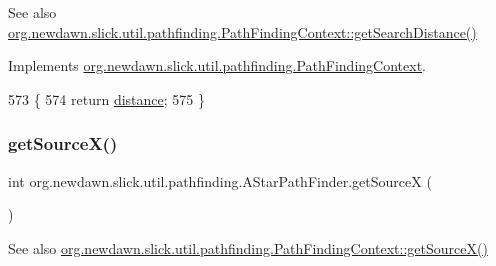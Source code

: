\begin{DoxySeeAlso}{See also}
\mbox{\hyperlink{interfaceorg_1_1newdawn_1_1slick_1_1util_1_1pathfinding_1_1_path_finding_context_af6c873041cbca8ad6edfd63c6e10d243}{org.\+newdawn.\+slick.\+util.\+pathfinding.\+Path\+Finding\+Context\+::get\+Search\+Distance()}} 
\end{DoxySeeAlso}


Implements \mbox{\hyperlink{interfaceorg_1_1newdawn_1_1slick_1_1util_1_1pathfinding_1_1_path_finding_context_af6c873041cbca8ad6edfd63c6e10d243}{org.\+newdawn.\+slick.\+util.\+pathfinding.\+Path\+Finding\+Context}}.


\begin{DoxyCode}
573                                    \{
574         \textcolor{keywordflow}{return} \mbox{\hyperlink{classorg_1_1newdawn_1_1slick_1_1util_1_1pathfinding_1_1_a_star_path_finder_a8c4940ca4de03b42628e5cc6145e1390}{distance}};
575     \}
\end{DoxyCode}
\mbox{\label{classorg_1_1newdawn_1_1slick_1_1util_1_1pathfinding_1_1_a_star_path_finder_a170c66a9356c930fa83a50567f64be52}} 
\subsubsection{\texorpdfstring{get\+Source\+X()}{getSourceX()}}
{\footnotesize\ttfamily int org.\+newdawn.\+slick.\+util.\+pathfinding.\+A\+Star\+Path\+Finder.\+get\+SourceX (\begin{DoxyParamCaption}{ }\end{DoxyParamCaption})\hspace{0.3cm}{\ttfamily [inline]}}

\begin{DoxySeeAlso}{See also}
\mbox{\hyperlink{interfaceorg_1_1newdawn_1_1slick_1_1util_1_1pathfinding_1_1_path_finding_context_a7b67cdc7d0eaf54e6e07d09b1a575065}{org.\+newdawn.\+slick.\+util.\+pathfinding.\+Path\+Finding\+Context\+::get\+Source\+X()}} 
\end{DoxySeeAlso}


